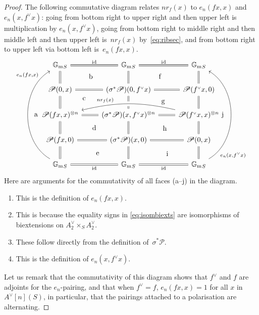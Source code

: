 \documentclass[11pt]{article}
\providecommand{\G}{}
\let\mathcal\mathscr
\let\oldvee\vee
\renewcommand{\vee}{{\scriptscriptstyle\oldvee}}
\theoremstyle{plain}
\theoremstyle{definition}
\numberwithin{equation}{subsection}
\renewcommand{\G}{\mathbb G}
\newcommand{\calP}{\mathcal{P}}
\newcommand{\Gm}{\G_{\mathrm{m}}}
\DeclareMathOperator{\id}{id}
\begin{document}
\begin{proof}
The following commutative diagram relates $nr_f(x)$ to $e_n(fx,x)$ and
$e_n(x,f^\vee x)$: going from bottom right to upper right and then
upper left is multiplication by $e_n(x,f^\vee x)$, going from bottom
right to middle right and then middle left and then upper left
is~$nr_f(x)$ by~\eqref{eq:ribsec}, and from bottom right to upper left
via bottom left is~$e_n(fx,x)$.
\begin{equation}\label{eq:ribsecweil}
\begin{tikzcd}
{\Gm}_S \arrow[r,equal, "\id"] \arrow[d,equal] \arrow[dr, phantom,
"\text{\scriptsize b}"]
& {\Gm}_S \arrow[r,equal,"\id"] \arrow[d,equal] \arrow[dr, phantom, "\text{\scriptsize f}"]
& {\Gm}_S \arrow[d,equal] \\
\calP(0,x) \arrow[d,equal] \arrow[r,equal] \arrow[dr, phantom, "\text{\scriptsize c}"
near start]
& (\sigma^*\calP)(0,f^\vee x) \arrow[d,equal] \arrow[r,equal]
\arrow[dr, phantom, "\text{\scriptsize g}"]
& \calP(f^\vee x,0) \arrow[d,equal] \\
\calP(fx,x)^{\otimes n} \arrow[d,equal] \arrow[r,equal]
\arrow[dr, phantom, "\text{\scriptsize d}"]
& (\sigma^*\calP)(x,f^\vee x)^{\otimes n} \arrow[d,equal]
\arrow[r,equal] \arrow[dr, phantom, "\text{\scriptsize h}"]
& \calP(f^\vee x,x)^{\otimes n} \arrow[d,equal]
\arrow[ll, bend right=13, crossing over, "{nr_f(x)}"' pos=0.65] \\
\calP(fx,0) \arrow[d,equal] \arrow[r,equal]
\arrow[dr, phantom, "\text{\scriptsize e}"]
& (\sigma^*\calP)(x,0) \arrow[d,equal] \arrow[r,equal]
\arrow[dr, phantom, "\text{\scriptsize i}"]
& \calP(0,x) \arrow[d,equal] \\
{\Gm}_S \arrow[r,equal,"\id"'] \arrow[uuuu,bend left=60,
"{e_n(fx,x)}", very near end]
\arrow[uuuu, phantom, bend left=45, "\text{\scriptsize a}"]
& {\Gm}_S \arrow[r,equal,"\id"']
& {\Gm}_S \arrow[uuuu,bend right=60,"{e_n(x,f^\vee x)}"', very near start]
\arrow[uuuu, phantom, bend right=45, "\text{\scriptsize j}"]
\end{tikzcd}
\end{equation}
Here are arguments for the commutativity of all faces (a--j) in the diagram.
\begin{enumerate}
\item[(a)] This is the definition of $e_n(fx,x)$.
\item[(b--e)] This is because the equality signs in
\eqref{eq:isombiexts} are isomorphisms of biextensions on
$A_2^\vee\times_S A_2^\vee$.
\item[(f--i)] These follow directly from the definition
of~$\sigma^*\calP$.
\item[(j)] This is the definition of $e_n(x,f^\vee x)$.
\end{enumerate}
Let us remark that the commutativity of this diagram shows that
$f^\vee$ and $f$ are adjoints for the $e_n$-pairing, and that when
$f^\vee=f$, $e_n(fx,x)=1$ for all $x$ in $A^\vee[n](S)$, in
particular, that the pairings attached to a polarisation are alternating.
\end{proof}
\end{document}
